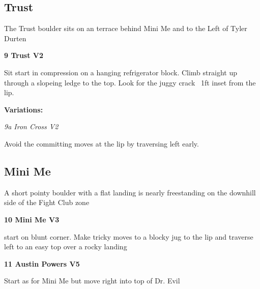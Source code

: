 \begin{multicols}{2}
			\subsection*{Trust}\label{bf:Trust}
			\begin{minipage}{\columnwidth}
			The Trust boulder sits on an terrace behind Mini Me and to the Left of Tyler Durten
			\end{minipage}
			

					\begin{minipage}{\linewidth}	
					\label{rt:Trust}\colorbox{green!20}{\textbf{9 Trust V2 \ding{72}    }}
					\begin{adjustwidth}{0.5cm}{}				
					Sit start in compression on a hanging refrigerator block. Climb straight up through a slopeing ledge to the top. Look for the juggy crack ~1ft inset from the lip.
					\end{adjustwidth}
					\end{minipage}
						\begin{adjustwidth}{0.5cm}{}				
						\textbf{Variations:} \newline
							\begin{minipage}{\linewidth}	
							\label{vr:Iron Cross}\colorbox{green!20}{\emph{9a Iron Cross V2   }}
							\begin{adjustwidth}{0.5cm}{}				
							Avoid the committing moves at the lip by traversing left early.
							\end{adjustwidth}
							\end{minipage}
						\end{adjustwidth}
			\subsection*{Mini Me}\label{bf:Mini Me}
			\begin{minipage}{\columnwidth}
			A short pointy boulder with a flat landing is nearly freestanding on the downhill side of the Fight Club zone
			\end{minipage}
			
					\begin{minipage}{\linewidth}	
					\label{rt:Mini Me}\colorbox{green!20}{\textbf{10 Mini Me V3 \ding{73} }}
					\begin{adjustwidth}{0.5cm}{}				
					start on blunt corner. Make tricky moves to a blocky jug to the lip and traverse left to an easy top over a rocky landing
					\end{adjustwidth}
					\end{minipage}
					\begin{minipage}{\linewidth}	
					\label{rt:Austin Powers}\colorbox{RoyalBlue!20}{\textbf{11 Austin Powers V5    }}
					\begin{adjustwidth}{0.5cm}{}				
					Start as for Mini Me but move right into top of Dr. Evil
					\end{adjustwidth}
					\end{minipage}


\end{multicols}
